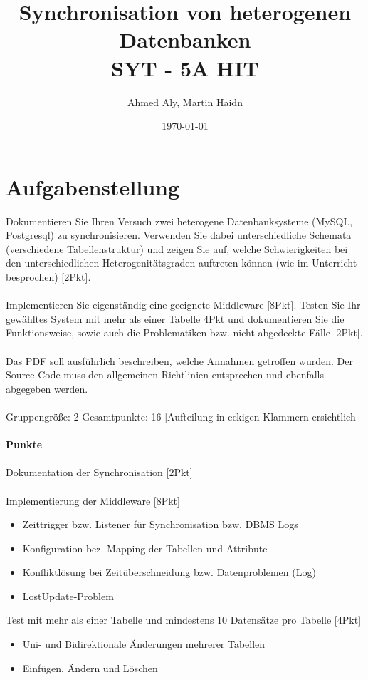 \documentclass[a4paper]{article}
\author{Ahmed Aly, Martin Haidn}
\title{Synchronisation von heterogenen Datenbanken\\SYT - 5A HIT}
\date{\today}
\begin{document}
	\maketitle
	\tableofcontents
	
	\newpage
	\section{Aufgabenstellung}
	Dokumentieren Sie Ihren Versuch zwei heterogene Datenbanksysteme (MySQL, Postgresql) zu synchronisieren. Verwenden Sie dabei unterschiedliche Schemata (verschiedene Tabellenstruktur) und zeigen Sie auf, welche Schwierigkeiten bei den unterschiedlichen Heterogenitätsgraden auftreten können (wie im Unterricht besprochen) [2Pkt].\\
	\\
	Implementieren Sie eigenständig eine geeignete Middleware [8Pkt]. Testen Sie Ihr gewähltes System mit mehr als einer Tabelle 4Pkt und dokumentieren Sie die Funktionsweise, sowie auch die Problematiken bzw. nicht abgedeckte Fälle [2Pkt].\\
	\\
	Das PDF soll ausführlich beschreiben, welche Annahmen getroffen wurden. Der Source-Code muss den allgemeinen Richtlinien entsprechen und ebenfalls abgegeben werden.\\
	\\
	Gruppengröße: 2 Gesamtpunkte: 16 [Aufteilung in eckigen Klammern ersichtlich]\\
	\\
	\textbf{Punkte}\\
	\\
	Dokumentation der Synchronisation [2Pkt]\\
	\\
	Implementierung der Middleware [8Pkt]
	\begin{itemize}
		\item Zeittrigger bzw. Listener für Synchronisation bzw. DBMS Logs
		\item Konfiguration bez. Mapping der Tabellen und Attribute
		\item Konfliktlösung bei Zeitüberschneidung bzw. Datenproblemen (Log)
		\item LostUpdate-Problem\\
	\end{itemize}
	
	Test mit mehr als einer Tabelle und mindestens 10 Datensätze pro Tabelle [4Pkt]
	\begin{itemize}
		\item Uni- und Bidirektionale Änderungen mehrerer Tabellen
		\item Einfügen, Ändern und Löschen\\
	\end{itemize}
	
\end{document}
